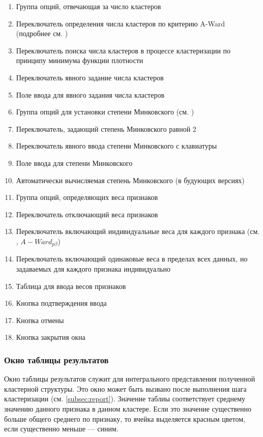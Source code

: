 \documentclass[12pt,tikz]{instruction}
\begin{document}
\begin{enumerate}
	\item Группа опций, отвечающая за число кластеров
	\item Переключатель определения числа кластеров по критерию A-Ward (подробнее см. \cite{mirkin_formula_8})
	\item Переключатель поиска числа кластеров в процессе кластеризации по принципу минимума функции плотности \cite{kovaleva}
	\item Переключатель явного задание числа кластеров 
	\item Поле ввода для явного задания числа кластеров 
	\item Группа опций для установки степени Минковского (см. \cite{amorim})
	\item Переключатель, задающий степень Минковского равной 2
	\item Переключатель явного ввода степени Минковского с клавиатуры
	\item Поле ввода для степени Минковского
	\item Автоматически вычисляемая степень Минковского (в будующих версиях)
	\item Группа опций, определяющих веса признаков
	\item Переключатель отключающий веса признаков
	\item Переключатель включающий индивидуальные веса для каждого признака (см. \cite{amorim}, $A-Ward_{p\beta}$)
	\item Переключатель включающий одинаковые веса в пределах всех данных, но задаваемых для каждого признака индивидуально 
	\item Таблица для ввода весов признаков
	\item Кнопка подтверждения ввода
	\item Кнопка отмены
	\item Кнопка закрытия окна
\end{enumerate}



\subsubsection{Окно таблицы результатов}

Окно таблицы результатов служит для интегрального представления полученной кластерной структуры. Это окно может быть вызвано после выполнения шага кластеризации (см. \ref{subsec:report}). Значение таблиы соответствует среднему значению данного признака в данном кластере. Если это значение существенно больше общего среднего по признаку, то ячейка выделяется красным цветом, если существенно меньше --- синим.
\end{document}

